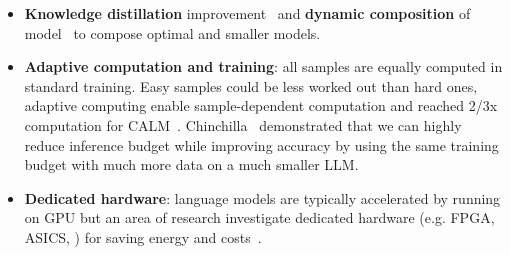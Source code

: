 \documentclass[acmsmall]{acmart}
\begin{document}
\begin{itemize}
    \item \textbf{Knowledge distillation} improvement~\citep{blakeneyReduceReuseRecycle2022, zaheerTeacherGuidedTraining2022, wahleCohesiveDistillationArchitecture2023} and \textbf{dynamic composition} of model~\citep{xuSurveyDynamicNeural2022} to compose optimal and smaller models.
    \item \textbf{Adaptive computation and training}: all samples are equally computed in standard training. Easy samples could be less worked out than hard ones, adaptive computing enable sample-dependent computation and reached 2/3x computation for CALM~\citep{schusterConfidentAdaptiveLanguage2022}. Chinchilla~\citep{hoffmannTrainingComputeOptimalLarge2022} demonstrated that we can highly reduce inference budget while improving accuracy by using the same training budget with much more data on a much smaller LLM.
    \item \textbf{Dedicated hardware}: language models are typically accelerated by running on GPU but an area of research investigate dedicated hardware (e.g. FPGA, ASICS, ) for saving energy and costs~\citep{hongDFXLowlatencyMultiFPGA2022a}.
\end{itemize}
\end{document}
